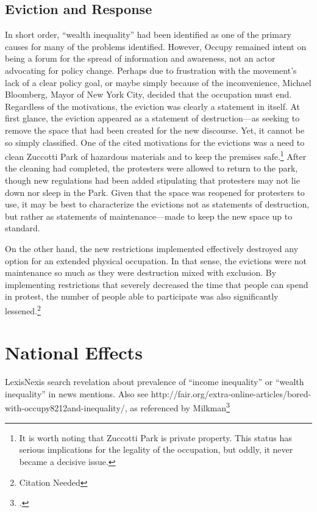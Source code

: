 \documentclass{article}
\begin{document}
\subsection{Eviction and Response}
In short order, ``wealth inequality'' had been identified as one of the primary causes for many of the problems identified.
However, Occupy remained intent on being a forum for the spread of information and awareness, not an actor advocating for policy change.
Perhaps due to frustration with the movement's lack of a clear policy goal, or maybe simply because of the inconvenience, Michael Bloomberg, Mayor of New York City, decided that the occupation must end.
Regardless of the motivations, the eviction was clearly a statement in itself.
At first glance, the eviction appeared as a statement of destruction---as seeking to remove the space that had been created for the new discourse.
Yet, it cannot be so simply classified.
One of the cited motivations for the evictions was a need to clean Zuccotti Park of hazardous materials and to keep the premises safe.\footnote{It is worth noting that Zuccotti Park is private property. This status has serious implications for the legality of the occupation, but oddly, it never became a decisive issue.}
After the cleaning had completed, the protesters were allowed to return to the park, though new regulations had been added stipulating that protesters may not lie down nor sleep in the Park.
Given that the space was reopened for protesters to use, it may be best to characterize the evictions not as statements of destruction, but rather as statements of maintenance---made to keep the new space up to standard.

On the other hand, the new restrictions implemented effectively destroyed any option for an extended physical occupation.
In that sense, the evictions were not maintenance so much as they were destruction mixed with exclusion.
By implementing restrictions that severely decreased the time that people can spend in protest, the number of people able to participate was also significantly lessened.\footnote{Citation Needed}


\section{National Effects}
LexisNexis search revelation about prevalence of ``income inequality'' or ``wealth inequality'' in news mentions.
Also see http://fair.org/extra-online-articles/bored-with-occupy8212and-inequality/, as referenced by Milkman\footcite[38]{milkman13}
\end{document}
